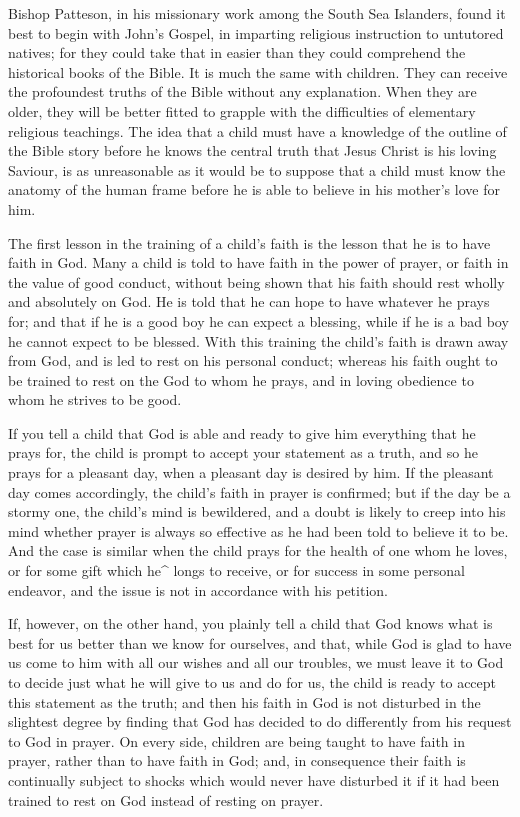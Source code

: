 \documentclass[
]{book}
\begin{document}
Bishop Patteson, in his missionary work among the South Sea Islanders, found it best to begin with John's Gospel, in imparting religious instruction to untutored natives; for they could take that in easier than they could comprehend the historical books of the Bible. It is much the same with children. They can receive the profoundest truths of the Bible without any explanation. When they are older, they will be better fitted to grapple with the difficulties of elementary religious teachings. The idea that a child must have a knowledge of the outline of the Bible story before he knows the central truth that Jesus Christ is his loving Saviour, is as unreasonable as it would be to suppose that a child must know the anatomy of the human frame before he is able to believe in his mother's love for him.

The first lesson in the training of a child's faith is the lesson that he is to have faith in God. Many a child is told to have faith in the power of prayer, or faith in the value of good conduct, without being shown that his faith should rest wholly and absolutely on God. He is told that he can hope to have whatever he prays for; and that if he is a good boy he can expect a blessing, while if he is a bad boy he cannot expect to be blessed. With this training the child's faith is drawn away from God, and is led to rest on his personal conduct; whereas his faith ought to be trained to rest on the God to whom he prays, and in loving obedience to whom he strives to be good.

If you tell a child that God is able and ready to give him everything that he prays for, the child is prompt to accept your statement as a truth, and so he prays for a pleasant day, when a pleasant day is desired by him. If the pleasant day comes accordingly, the child's faith in prayer is confirmed; but if the day be a stormy one, the child's mind is bewildered, and a doubt is likely to creep into his mind whether prayer is always so effective as he had been told to believe it to be. And the case is similar when the child prays for the health of one whom he loves, or for some gift which he\^{} longs to receive, or for success in some personal endeavor, and the issue is not in accordance with his petition.

If, however, on the other hand, you plainly tell a child that God knows what is best for us better than we know for ourselves, and that, while God is glad to have us come to him with all our wishes and all our troubles, we must leave it to God to decide just what he will give to us and do for us, the child is ready to accept this statement as the truth; and then his faith in God is not disturbed in the slightest degree by finding that God has decided to do differently from his request to God in prayer. On every side, children are being taught to have faith in prayer, rather than to have faith in God; and, in consequence their faith is continually subject to shocks which would never have disturbed it if it had been trained to rest on God instead of resting on prayer.
\end{document}
